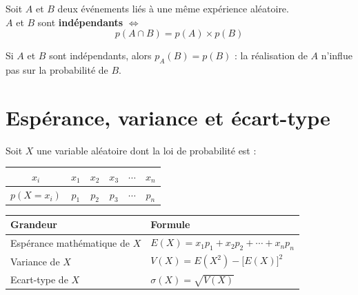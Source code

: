 \begin{theoreme}
Soit $A$ et $B$ deux \'{e}v\'{e}nements li\'{e}s \`{a} une m\^{e}me exp\'{e}rience al\'{e}atoire.\\
$A$ et $B$ sont \textbf{ind\'{e}pendants} $\Longleftrightarrow$
\[
  p(A \cap B) = p(A) \times p(B)
\]
\end{theoreme}

\begin{remarque}
Si $A$ et $B$ sont ind\'{e}pendants, alors $p_A(B) = p(B)$ :
la r\'{e}alisation de $A$ n'influe pas sur la probabilit\'{e} de $B$.
\end{remarque}

\section{Esp\'{e}rance, variance et \'{e}cart-type}

\begin{definition}
Soit $X$ une variable al\'{e}atoire dont la loi de probabilit\'{e} est :

\medskip
\begin{center}
\renewcommand{\arraystretch}{1.5}
\begin{tabular}{|c|c|c|c|c|c|}
  \hline
  \rowcolor{navylight}
  $x_i$ & $x_1$ & $x_2$ & $x_3$ & $\cdots$ & $x_n$ \\
  \hline
  $p(X = x_i)$ & $p_1$ & $p_2$ & $p_3$ & $\cdots$ & $p_n$ \\
  \hline
\end{tabular}
\end{center}

\medskip
\begin{center}
\renewcommand{\arraystretch}{1.8}
\begin{tabular}{|l|l|}
  \hline
  \rowcolor{navylight}
  \textbf{\color{navy}Grandeur} & \textbf{\color{navy}Formule} \\
  \hline
  Esp\'{e}rance math\'{e}matique de $X$
    & $E(X) = x_1 p_1 + x_2 p_2 + \cdots + x_n p_n$ \\
  \hline
  Variance de $X$
    & $V(X) = E(X^2) - \bigl[E(X)\bigr]^2$ \\
  \hline
  Ecart-type de $X$
    & $\sigma(X) = \sqrt{V(X)}$ \\
  \hline
\end{tabular}
\end{center}
\end{definition}

